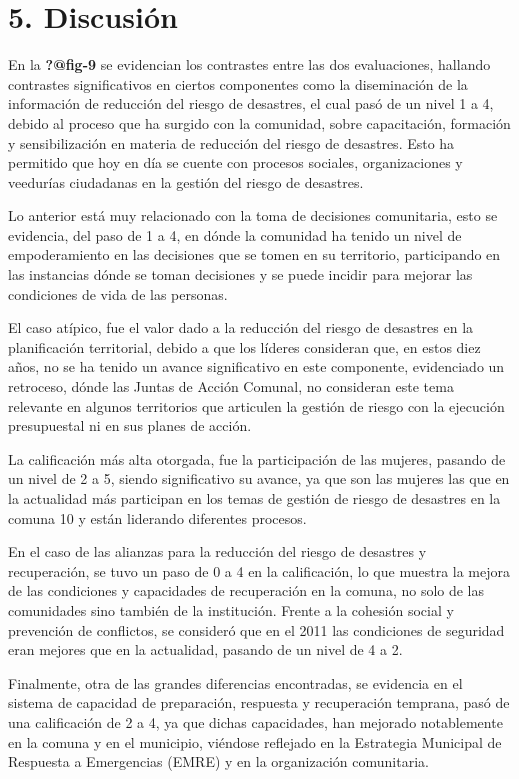 \documentclass[
  letterpaper,
]{book}
\begin{document}

\chapter{5. Discusión}\label{discusiuxf3n}

En la \textbf{?@fig-9} se evidencian los contrastes entre las dos
evaluaciones, hallando contrastes significativos en ciertos componentes
como la diseminación de la información de reducción del riesgo de
desastres, el cual pasó de un nivel 1 a 4, debido al proceso que ha
surgido con la comunidad, sobre capacitación, formación y
sensibilización en materia de reducción del riesgo de desastres. Esto ha
permitido que hoy en día se cuente con procesos sociales, organizaciones
y veedurías ciudadanas en la gestión del riesgo de desastres.

Lo anterior está muy relacionado con la toma de decisiones comunitaria,
esto se evidencia, del paso de 1 a 4, en dónde la comunidad ha tenido un
nivel de empoderamiento en las decisiones que se tomen en su territorio,
participando en las instancias dónde se toman decisiones y se puede
incidir para mejorar las condiciones de vida de las personas.

El caso atípico, fue el valor dado a la reducción del riesgo de
desastres en la planificación territorial, debido a que los líderes
consideran que, en estos diez años, no se ha tenido un avance
significativo en este componente, evidenciado un retroceso, dónde las
Juntas de Acción Comunal, no consideran este tema relevante en algunos
territorios que articulen la gestión de riesgo con la ejecución
presupuestal ni en sus planes de acción.

La calificación más alta otorgada, fue la participación de las mujeres,
pasando de un nivel de 2 a 5, siendo significativo su avance, ya que son
las mujeres las que en la actualidad más participan en los temas de
gestión de riesgo de desastres en la comuna 10 y están liderando
diferentes procesos.

En el caso de las alianzas para la reducción del riesgo de desastres y
recuperación, se tuvo un paso de 0 a 4 en la calificación, lo que
muestra la mejora de las condiciones y capacidades de recuperación en la
comuna, no solo de las comunidades sino también de la institución.
Frente a la cohesión social y prevención de conflictos, se consideró que
en el 2011 las condiciones de seguridad eran mejores que en la
actualidad, pasando de un nivel de 4 a 2.

Finalmente, otra de las grandes diferencias encontradas, se evidencia en
el sistema de capacidad de preparación, respuesta y recuperación
temprana, pasó de una calificación de 2 a 4, ya que dichas capacidades,
han mejorado notablemente en la comuna y en el municipio, viéndose
reflejado en la Estrategia Municipal de Respuesta a Emergencias (EMRE) y
en la organización comunitaria.
\end{document}
